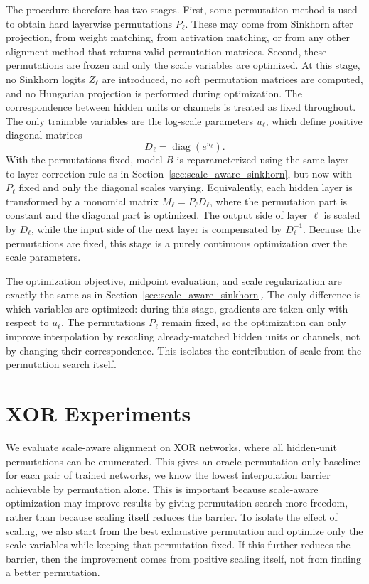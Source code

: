\documentclass[11pt,a4paper]{report}
\begin{document}
The procedure therefore has two stages. First, some permutation method is used to obtain hard layerwise permutations \(P_\ell\). These may come from Sinkhorn after projection, from weight matching, from activation matching, or from any other alignment method that returns valid permutation matrices. Second, these permutations are frozen and only the scale variables are optimized. At this stage, no Sinkhorn logits \(Z_\ell\) are introduced, no soft permutation matrices are computed, and no Hungarian projection is performed during optimization. The correspondence between hidden units or channels is treated as fixed throughout. The only trainable variables are the log-scale parameters \(u_\ell\), which define positive diagonal matrices
\[
D_\ell=\operatorname{diag}(e^{u_\ell}).
\]
With the permutations fixed, model \(B\) is reparameterized using the same layer-to-layer correction rule as in Section~\ref{sec:scale_aware_sinkhorn}, but now with \(P_\ell\) fixed and only the diagonal scales varying. Equivalently, each hidden layer is transformed by a monomial matrix \(M_\ell=P_\ell D_\ell\), where the permutation part is constant and the diagonal part is optimized. The output side of layer \(\ell\) is scaled by \(D_\ell\), while the input side of the next layer is compensated by \(D_\ell^{-1}\). Because the permutations are fixed, this stage is a purely continuous optimization over the scale parameters.

The optimization objective, midpoint evaluation, and scale regularization are exactly the same as in Section~\ref{sec:scale_aware_sinkhorn}. The only difference is which variables are optimized: during this stage, gradients are taken only with respect to \(u_\ell\). The permutations \(P_\ell\) remain fixed, so the optimization can only improve interpolation by rescaling already-matched hidden units or channels, not by changing their correspondence. This isolates the contribution of scale from the permutation search itself.


\section{XOR Experiments}

We evaluate scale-aware alignment on XOR networks, where all hidden-unit permutations can be enumerated. This gives an oracle permutation-only baseline: for each pair of trained networks, we know the lowest interpolation barrier achievable by permutation alone. This is important because scale-aware optimization may improve results by giving permutation search more freedom, rather than because scaling itself reduces the barrier. To isolate the effect of scaling, we also start from the best exhaustive permutation and optimize only the scale variables while keeping that permutation fixed. If this further reduces the barrier, then the improvement comes from positive scaling itself, not from finding a better permutation.
\end{document}
